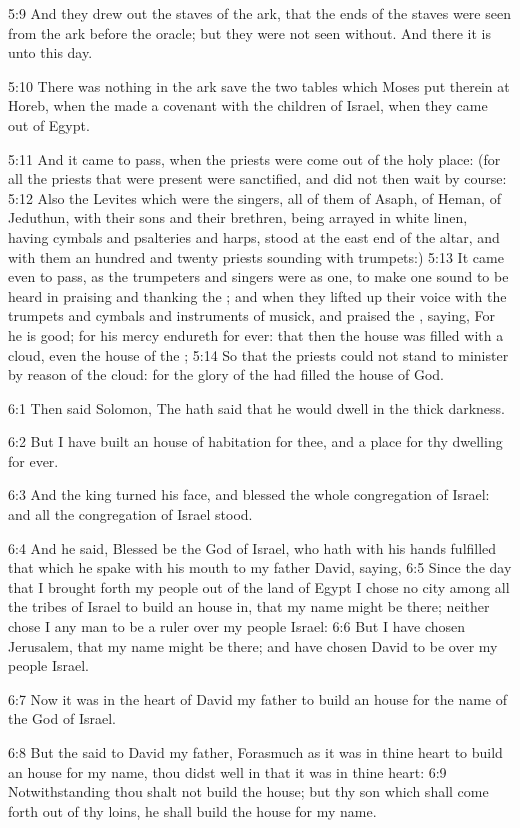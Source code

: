 5:9 And they drew out the staves of the ark, that the ends of the
staves were seen from the ark before the oracle; but they were not
seen without. And there it is unto this day.

5:10 There was nothing in the ark save the two tables which Moses put
therein at Horeb, when the \LORD made a covenant with the children of
Israel, when they came out of Egypt.

5:11 And it came to pass, when the priests were come out of the holy
place: (for all the priests that were present were sanctified, and did
not then wait by course: 5:12 Also the Levites which were the singers,
all of them of Asaph, of Heman, of Jeduthun, with their sons and their
brethren, being arrayed in white linen, having cymbals and psalteries
and harps, stood at the east end of the altar, and with them an
hundred and twenty priests sounding with trumpets:) 5:13 It came even
to pass, as the trumpeters and singers were as one, to make one sound
to be heard in praising and thanking the \LORD; and when they lifted up
their voice with the trumpets and cymbals and instruments of musick,
and praised the \LORD, saying, For he is good; for his mercy endureth
for ever: that then the house was filled with a cloud, even the house
of the \LORD; 5:14 So that the priests could not stand to minister by
reason of the cloud: for the glory of the \LORD had filled the house of
God.

6:1 Then said Solomon, The \LORD hath said that he would dwell in the
thick darkness.

6:2 But I have built an house of habitation for thee, and a place for
thy dwelling for ever.

6:3 And the king turned his face, and blessed the whole congregation
of Israel: and all the congregation of Israel stood.

6:4 And he said, Blessed be the \LORD God of Israel, who hath with his
hands fulfilled that which he spake with his mouth to my father David,
saying, 6:5 Since the day that I brought forth my people out of the
land of Egypt I chose no city among all the tribes of Israel to build
an house in, that my name might be there; neither chose I any man to
be a ruler over my people Israel: 6:6 But I have chosen Jerusalem,
that my name might be there; and have chosen David to be over my
people Israel.

6:7 Now it was in the heart of David my father to build an house for
the name of the \LORD God of Israel.

6:8 But the \LORD said to David my father, Forasmuch as it was in thine
heart to build an house for my name, thou didst well in that it was in
thine heart: 6:9 Notwithstanding thou shalt not build the house; but
thy son which shall come forth out of thy loins, he shall build the
house for my name.

